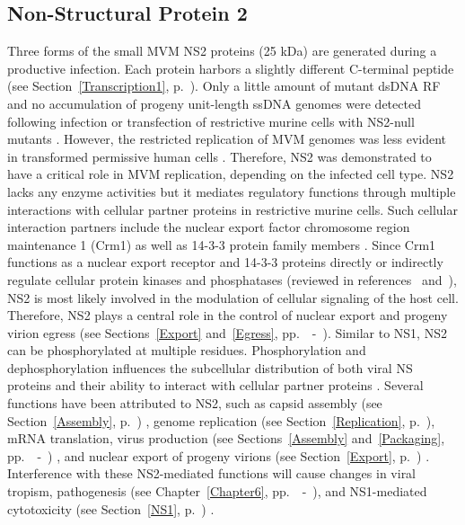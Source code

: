\subsection{Non-Structural Protein 2}
Three forms of the small MVM NS2 proteins (25 kDa) are generated during a productive infection. Each protein harbors a slightly different C-terminal peptide (see Section~\ref{Transcription1}, p.~\pageref{Transcription1}). Only a little amount of mutant dsDNA RF and no accumulation of progeny unit-length ssDNA genomes were detected following infection or transfection of restrictive murine cells with NS2-null mutants \cite{pmid1385828}. However, the restricted replication of MVM genomes was less evident in transformed permissive human cells \cite{pmid2147041}. Therefore, NS2 was demonstrated to have a critical role in MVM replication, depending on the infected cell type. NS2 lacks any enzyme activities but it mediates regulatory functions through multiple interactions with cellular partner proteins in restrictive murine cells. Such cellular interaction partners include the nuclear export factor chromosome region maintenance 1 (Crm1) as well as 14-3-3 protein family members \cite{pmid10438867, pmid10527855, pmid8892871}. Since Crm1 functions as a nuclear export receptor and 14-3-3 proteins directly or indirectly regulate cellular protein kinases and phosphatases (reviewed in references \cite{pmid7709434}~and~\cite{pmid7743183}), NS2 is most likely involved in the modulation of cellular signaling of the host cell. Therefore, NS2 plays a central role in the control of nuclear export and progeny virion egress (see Sections~\ref{Export} and~\ref{Egress}, pp.~\pageref{Export}~-~\pageref{Egress1}). Similar to NS1, NS2 can be phosphorylated at multiple residues. Phosphorylation and dephosphorylation influences the subcellular distribution of both viral NS proteins \cite{pmid2142555} and their ability to interact with cellular partner proteins \cite{pmid10438867}. Several functions have been attributed to NS2, such as capsid assembly (see Section~\ref{Assembly}, p.~\pageref{Assembly}) \cite{pmid9168889}, genome replication (see Section~\ref{Replication}, p.~\pageref{Replication}), mRNA translation, virus production (see Sections~\ref{Assembly} and~\ref{Packaging}, pp.~\pageref{Assembly}~-~\pageref{Packaging1}) \cite{pmid2147041, pmid8419637}, and nuclear export of progeny virions (see Section~\ref{Export}, p.~\pageref{Export}) \cite{pmid11884550, pmid10527855, pmid12239307, pmid10438867}. Interference with these NS2-mediated functions will cause changes in viral tropism, pathogenesis (see Chapter~\ref{Chapter6}, pp.~\pageref{Chapter6}~-~\pageref{Chaper6end}), and NS1-mediated cytotoxicity (see Section~\ref{NS1}, p.~\pageref{NS1}) \cite{pmid2137660, pmid1373202, pmid9519837, pmid16039688, pmid8317090}.                 



